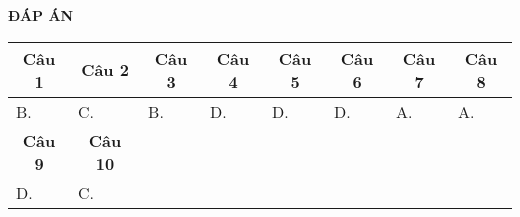 \begin{center}
	\textbf{ĐÁP ÁN}
	
	\begin{longtable}[\textwidth]{|p{}|p{}|p{}|p{}|p{}|p{}|p{}|p{}|}
		\hline%
		\multicolumn{1}{|c}{\textbf{Câu 1}} & \multicolumn{1}{|c|}{\textbf{Câu 2}} & \multicolumn{1}{c|}{\textbf{Câu 3}} &
		\multicolumn{1}{c|}{\textbf{Câu 4}} &
		\multicolumn{1}{c|}{\textbf{Câu 5}} &
		\multicolumn{1}{c|}{\textbf{Câu 6}} &
		\multicolumn{1}{c|}{\textbf{Câu 7}} &
		\multicolumn{1}{c|}{\textbf{Câu 8}}\\
		\hline
		B.&C. &B. &D. &D. &D. &A. &A.	\\
		\hline
		
		\multicolumn{1}{|c|}{\textbf{Câu 9}} & \multicolumn{1}{c|}{\textbf{Câu 10}} & \multicolumn{1}{c|}{\textbf{}} &
		\multicolumn{1}{c|}{\textbf{}} &
		\multicolumn{1}{c|}{\textbf{}} &
		\multicolumn{1}{c|}{\textbf{}} &
		\multicolumn{1}{c|}{\textbf{}} &
		\multicolumn{1}{c|}{} \\
		\hline
		D. &C. & & & & & &\\
		\hline	
		
		
	\end{longtable}
	
\end{center}









